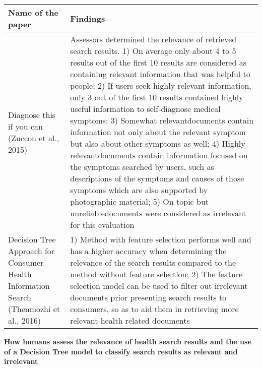\documentclass[]{article}
\begin{document}
\begin{center}
	\begin{longtable}{||p{4cm} | p{10cm}||} 
		\hline
		\textbf{Name of the paper} & \textbf{Findings}\\ [0.5ex] 
		\hline\hline
		Diagnose this if you can (Zuccon et al., 2015) & Assessors determined the relevance of retrieved search results. 1) On average only about 4 to 5 results out of the first 10 results are considered as containing relevant information that was helpful to people; 2) If users seek highly relevant information, only 3 out of the first 10 results contained highly useful information to self-diagnose medical symptoms; 3) \textquotesingle Somewhat relevant\textquotesingle documents contain information not only about the relevant symptom but also  about other symptoms as well; 4) \textquotesingle Highly relevant\textquotesingle documents contain information focused on the symptoms searched by users, such as descriptions of the symptoms and causes of those symptoms which are also supported by photographic material; 5) \textquotesingle On topic but unreliable\textquotesingle documents were considered as irrelevant for this evaluation\\ \hline Decision Tree Approach for Consumer Health Information Search (Thenmozhi et al., 2016) & 1) Method with feature selection performs well and has a higher accuracy when determining the relevance of the search results compared to the method without feature selection; 2) The feature selection model can be used to filter out irrelevant documents prior presenting search results to consumers, so as to aid them in retrieving more relevant health related documents \\		
		\hline
	\end{longtable}	
	
\end{center} 

\textbf{How humans assess the relevance of health search results and the use of a Decision Tree model to classify search results as relevant and irrelevant}\\ 
\end{document}
